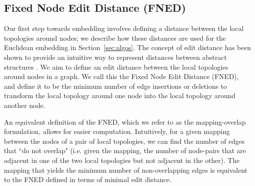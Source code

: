 \documentclass{article}
\begin{document}
\subsection{Fixed Node Edit Distance (FNED)}
Our first step towards embedding involves defining a distance between the local topologies around nodes; we describe how these distances are used for the Euclidean embedding in Section~\ref{sec:algos}. The concept of edit distance has been shown to provide an intuitive way to represent distances between abstract structures \cite{riesen2009approximate,reis2004automatic,gao2010survey}. We aim to define an edit distance between the local topologies around nodes in a graph. We call this the Fixed Node Edit Distance (FNED), and define it to be the minimum number of edge insertions or deletions to transform the local topology around one node into the local topology around another node.

An equivalent definition of the FNED, which we refer to as the mapping-overlap formulation, allows for easier computation. Intuitively, for a given mapping between the nodes of a pair of local topologies, we can find the number of edges that ``do not overlap" (i.e. given the mapping, the number of node-pairs that are adjacent in one of the two local topologies but not adjacent in the other). The mapping that yields the minimum number of non-overlapping edges is equivalent to the FNED defined in terms of minimal edit distance.
\end{document}
